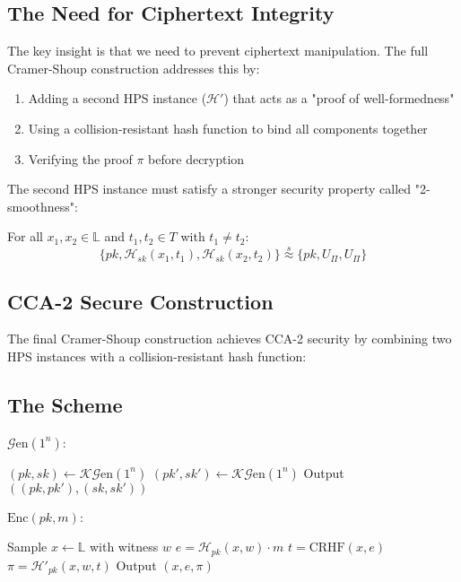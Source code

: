 \subsection{The Need for Ciphertext Integrity}

The key insight is that we need to prevent ciphertext manipulation. The full Cramer-Shoup construction addresses this by:

\begin{enumerate}
    \item Adding a second HPS instance ($\mathcal{H}'$) that acts as a "proof of well-formedness"
    \item Using a collision-resistant hash function to bind all components together
    \item Verifying the proof $\pi$ before decryption
\end{enumerate}

The second HPS instance must satisfy a stronger security property called "2-smoothness":

\begin{definition}[2-Smoothness]
For all $x_1,x_2 \in \mathbb{L}$ and $t_1,t_2 \in T$ with $t_1 \neq t_2$:
\[ \{pk, \mathcal{H}_{sk}(x_1,t_1), \mathcal{H}_{sk}(x_2,t_2)\} \stackrel{s}{\approx} \{pk, U_\Pi, U_\Pi\} \]
\end{definition}

\subsection{CCA-2 Secure Construction}

The final Cramer-Shoup construction achieves CCA-2 security by combining two HPS instances with a collision-resistant hash function:

\subsection{The Scheme}

$\mathcal{G}\text{en}(1^n)$:
\begin{algorithmic}
    \State $(pk,sk) \leftarrow \mathcal{K}\mathcal{G}\text{en}(1^n)$
    \State $(pk',sk') \leftarrow \mathcal{K}\mathcal{G}\text{en}(1^n)$
    \State Output $((pk,pk'),(sk,sk'))$
\end{algorithmic}

$\text{Enc}(pk,m)$:
\begin{algorithmic}
    \State Sample $x \leftarrow \mathbb{L}$ with witness $w$
    \State $e = \mathcal{H}_{pk}(x,w) \cdot m$
    \State $t = \text{CRHF}(x,e)$
    \State $\pi = \mathcal{H}'_{pk}(x,w,t)$
    \State Output $(x,e,\pi)$
\end{algorithmic}

